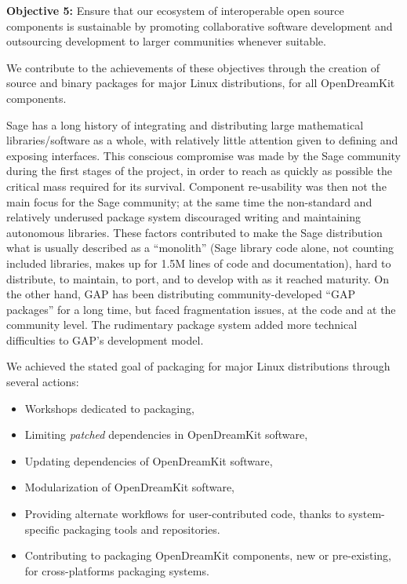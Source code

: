 \textbf{Objective 5:} Ensure that our ecosystem of interoperable open
source components is sustainable by promoting collaborative software
development and outsourcing development to larger communities whenever
suitable.

We contribute to the achievements of these objectives through the
creation of source and binary packages for major Linux distributions,
for all OpenDreamKit components.

Sage has a long history of integrating and distributing large
mathematical libraries/software as a whole, with relatively little
attention given to defining and exposing interfaces. This conscious
compromise was made by the Sage community during the first stages of the
project, in order to reach as quickly as possible the critical mass
required for its survival. Component re-usability was then not the main
focus for the Sage community; at the same time the non-standard and
relatively underused package system discouraged writing and maintaining
autonomous libraries. These factors contributed to make the Sage
distribution what is usually described as a ``monolith'' (Sage library
code alone, not counting included libraries, makes up for 1.5M lines of
code and documentation), hard to distribute, to maintain, to port, and
to develop with as it reached maturity. On the other hand, GAP has been
distributing community-developed ``GAP packages'' for a long time, but
faced fragmentation issues, at the code and at the community level. The
rudimentary package system added more technical difficulties to GAP's
development model.

We achieved the stated goal of packaging for major Linux distributions
through several actions:

\begin{itemize}
\tightlist
\item
  Workshops dedicated to packaging,
\item
  Limiting \emph{patched} dependencies in OpenDreamKit software,
\item
  Updating dependencies of OpenDreamKit software,
\item
  Modularization of OpenDreamKit software,
\item
  Providing alternate workflows for user-contributed code, thanks to
  system-specific packaging tools and repositories.
\item
  Contributing to packaging OpenDreamKit components, new or
  pre-existing, for cross-platforms packaging systems.
\end{itemize}
